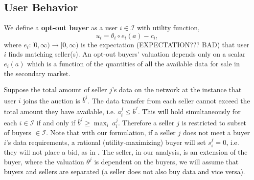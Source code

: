 \documentclass[12pt]{article}
\theoremstyle{definition}
\newcommand{\mcI}{\mathcal{I}}
\begin{document}
\begin{multicols}{2}
\subsection{User Behavior}

We define a \textbf{opt-out buyer} as a user $i\in\mcI$ with utility
function,
\begin{equation}\label{opt-utility}
    u_i = \theta_i \circ e_i(a) - c_i,
\end{equation}
where $e_i : [0, \infty) \rightarrow [0,\infty)$ is the expectation 
(EXPECTATION??? BAD) that user
$i$ finds matching seller(s). An opt-out buyers' valuation
depends only on a scalar $e_i(a)$ which is a function of the
quantities of all the available data for sale in the secondary market. 

Suppose the total amount of seller $j$'s data on the network at the instance that
user $i$ joins the auction is $\bar{b}^j$. 
The data transfer from each seller cannot exceed the total amount they have available,
i.e. $a_i^j \le \bar{b}^j$. This will hold simultaneously for each $i \in
\mcI$ if and only if $\bar{b}^j \ge \max_i \ a_i^j$. Therefore a seller $j$ is
restricted to subset of buyers $\in\mcI$.
Note that with our formulation, if a seller $j$ does not meet a buyer $i$'s data requirements, a
rational (utility-maximizing) buyer will set $s_i^j = 0$, i.e. they will not
place a bid, as in \cite{zheng}. The seller, in our analysis, is an extension of the buyer, where the valuation
$\theta^j$ is dependent on the buyers, we will assume that buyers and sellers
are separated (a seller does not also buy data and vice versa). 


\end{multicols}
\end{document}
